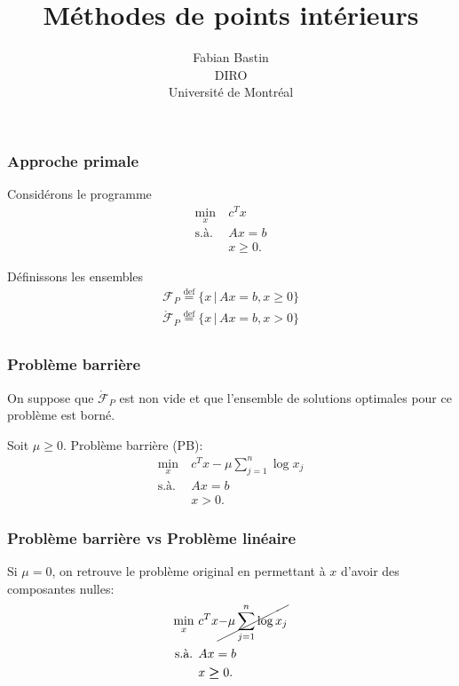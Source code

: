 \documentclass[usepdftitle=false, aspectratio=169]{beamer}
\title[Points intérieurs]{Méthodes de points intérieurs}
\author[Fabian Bastin]{Fabian Bastin\\DIRO\\Université de Montréal}
\date{}
\begin{document}
\frame{\titlepage}

\begin{frame}
\frametitle{Approche primale}



Considérons le programme
\begin{align*}
\min_x \ & c^Tx \\
\mbox{s.à. } & Ax = b\\
& x \geq 0.
\end{align*}

\mbox{}

Définissons les ensembles
\begin{align*}
\mathcal{F}_P \overset{\mbox{def}}{=} \lbrace x \,|\, Ax = b, x \geq 0 \rbrace\\
\mathring{\mathcal{F}}_P \overset{\mbox{def}}{=} \lbrace x \,|\, Ax = b, x > 0 \rbrace\\
\end{align*}

\end{frame}

\begin{frame}
\frametitle{Problème barrière}

On suppose que $\mathring{\mathcal{F}}_P$ est non vide et que l'ensemble de solutions optimales pour ce problème est borné.

\mbox{}

Soit $\mu \geq 0$. Problème barrière (PB):
\begin{align*}
\min_x \ & c^Tx - \mu \sum_{j = 1}^n \log x_j \\
\mbox{s.à. } & Ax = b \\
& x > 0.
\end{align*}

\end{frame}

\begin{frame}
\frametitle{Problème barrière vs Problème linéaire}

Si $\mu = 0$, on retrouve le problème original en permettant à $x$ d'avoir des composantes nulles:
\begin{align*}
\min_x \ & c^Tx \cancel{- \mu \sum_{j = 1}^n \log x_j} \\
\mbox{s.à. } & Ax = b \\
& x \boldsymbol{\geq} 0.
\end{align*}

\end{frame}
\end{document}
